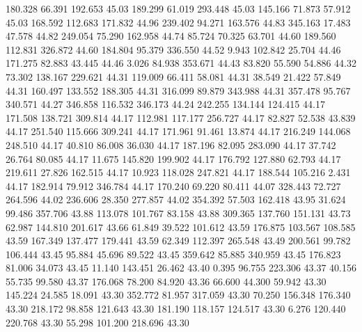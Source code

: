  180.328   66.391  192.653        45.03
 189.299   61.019  293.448        45.03
 145.166   71.873   57.912        45.03
 168.592  112.683  171.832        44.96
 239.402   94.271  163.576        44.83
 345.163   17.483   47.578        44.82
 249.054   75.290  162.958        44.74
  85.724   70.325   63.701        44.60
 189.560  112.831  326.872        44.60
 184.804   95.379  336.550        44.52
   9.943  102.842   25.704        44.46
 171.275   82.883   43.445        44.46
   3.026   84.938  353.671        44.43
  83.820   55.590   54.886        44.32
  73.302  138.167  229.621        44.31
 119.009   66.411   58.081        44.31
  38.549   21.422   57.849        44.31
 160.497  133.552  188.305        44.31
 316.099   89.879  343.988        44.31
 357.478   95.767  340.571        44.27
 346.858  116.532  346.173        44.24
 242.255  134.144  124.415        44.17
 171.508  138.721  309.814        44.17
 112.981  117.177  256.727        44.17
  82.827   52.538   43.839        44.17
 251.540  115.666  309.241        44.17
 171.961   91.461   13.874        44.17
 216.249  144.068  248.510        44.17
  40.810   86.008   36.030        44.17
 187.196   82.095  283.090        44.17
  37.742   26.764   80.085        44.17
  11.675  145.820  199.902        44.17
 176.792  127.880   62.793        44.17
 219.611   27.826  162.515        44.17
  10.923  118.028  247.821        44.17
 188.544  105.216    2.431        44.17
 182.914   79.912  346.784        44.17
 170.240   69.220   80.411        44.07
 328.443   72.727  264.596        44.02
 236.606   28.350  277.857        44.02
 354.392   57.503  162.418        43.95
  31.624   99.486  357.706        43.88
 113.078  101.767   83.158        43.88
 309.365  137.760  151.131        43.73
  62.987  144.810  201.617        43.66
  61.849   39.522  101.612        43.59
 176.875  103.567  108.585        43.59
 167.349  137.477  179.441        43.59
  62.349  112.397  265.548        43.49
 200.561   99.782  106.444        43.45
  95.884   45.696   89.522        43.45
 359.642   85.885  340.959        43.45
 176.823   81.006   34.073        43.45
  11.140  143.451   26.462        43.40
   0.395   96.755  223.306        43.37
  40.156   55.735   99.580        43.37
 176.068   78.200   84.920        43.36
  66.600   44.300   59.942        43.30
 145.224   24.585   18.091        43.30
 352.772   81.957  317.059        43.30
  70.250  156.348  176.340        43.30
 218.172   98.858  121.643        43.30
 181.190  118.157  124.517        43.30
   6.276  120.440  220.768        43.30
  55.298  101.200  218.696        43.30
